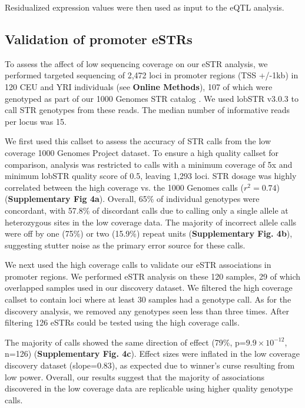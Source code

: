 Residualized expression values were then used as input to the eQTL
analysis.

\subsection{Validation of promoter eSTRs}

To assess the affect of low sequencing coverage on our eSTR analysis, we performed targeted sequencing of 2,472 loci in promoter regions (TSS +/-1kb) in 120 CEU and YRI individuals (see \textbf{Online Methods}), 107 of which were genotyped as part of our 1000 Genomes STR catalog \cite{WillemsGymrekHighnamEtAl2014}. We used lobSTR v3.0.3 to call STR genotypes from these reads. The median number of informative reads per locus was 15. 

We first used this callset to assess the accuracy of STR calls from the low coverage 1000 Genomes Project dataset. To ensure a high quality callset for comparison, analysis was restricted to calls with a minimum coverage of 5x and minimum lobSTR quality score of 0.5, leaving 1,293 loci. STR dosage was highly correlated between the high coverage vs. the 1000 Genomes calls ($r^2=0.74$) (\textbf{Supplementary Fig 4a}). Overall, 65\% of individual genotypes were concordant, with 57.8\% of discordant calls due to calling only a single allele at heterozygous sites in the low coverage data. The majority of incorrect allele calls were off by one (75\%) or two (15.9\%) repeat units (\textbf{Supplementary Fig. 4b}), suggesting stutter noise as the primary error source for these calls.

We next used the high coverage calls to validate our eSTR associations in promoter regions. We performed eSTR analysis on these 120 samples, 29 of which overlapped samples used in our discovery dataset. We filtered the high coverage callset to contain loci where at least 30 samples had a genotype call. As for the discovery analysis, we removed any genotypes seen less than three times. After filtering 126 eSTRs could be tested using the high coverage calls.

The majority of calls showed the same direction of effect (79\%, p=$9.9 \times 10^{-12}$, n=126) (\textbf{Supplementary Fig. 4c}). Effect sizes were inflated in the low coverage discovery dataset (slope=0.83), as expected due to winner's curse resulting from low power. Overall, our results suggest that the majority of associations discovered in the low coverage data are replicable using higher quality genotype calls.

